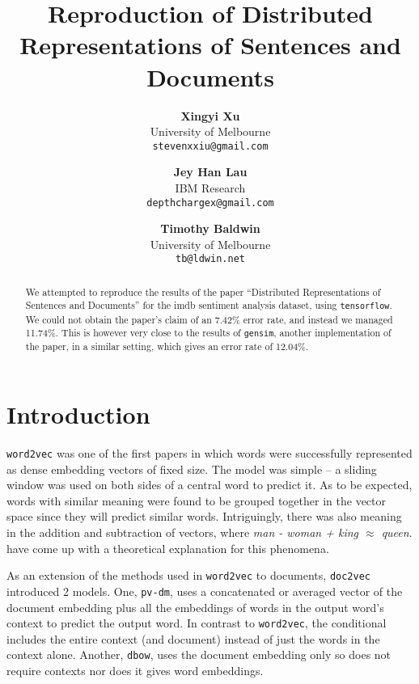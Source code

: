 \documentclass{article}
\begin{document}
\title{Reproduction of Distributed Representations of Sentences and Documents}

\author{
  \textbf{Xingyi Xu} \\ University of Melbourne \\ \texttt{stevenxxiu@gmail.com} \and
  \textbf{Jey Han Lau} \\ IBM Research \\ \texttt{depthchargex@gmail.com} \and
  \textbf{Timothy Baldwin} \\ University of Melbourne \\ \texttt{tb@ldwin.net}
}
\maketitle

\begin{abstract}
We attempted to reproduce the results of the paper ``Distributed Representations of Sentences and Documents'' for the imdb sentiment analysis dataset, using \texttt{tensorflow}. We could not obtain the paper's claim of an 7.42\% error rate, and instead we managed 11.74\%. This is however very close to the results of \texttt{gensim}, another implementation of the paper, in a similar setting, which gives an error rate of 12.04\%.
\end{abstract}

\section{Introduction}
\texttt{word2vec} \citep{mikolov_distributed_2013} was one of the first papers in which words were successfully represented as dense embedding vectors of fixed size. The model was simple -- a sliding window was used on both sides of a central word to predict it. As to be expected, words with similar meaning were found to be grouped together in the vector space since they will predict similar words. Intriguingly, there was also meaning in the addition and subtraction of vectors, where \textit{man - woman + king $\approx$ queen}. \cite{arora_rand-walk:_2015} have come up with a theoretical explanation for this phenomena.

As an extension of the methods used in \texttt{word2vec} to documents, \texttt{doc2vec} \citep{le_distributed_2014} introduced 2 models. One, \texttt{pv-dm}, uses a concatenated or averaged vector of the document embedding plus all the embeddings of words in the output word's context to predict the output word. In contrast to \texttt{word2vec}, the conditional includes the entire context (and document) instead of just the words in the context alone. Another, \texttt{dbow}, uses the document embedding only so does not require contexts nor does it gives word embeddings.
\end{document}
